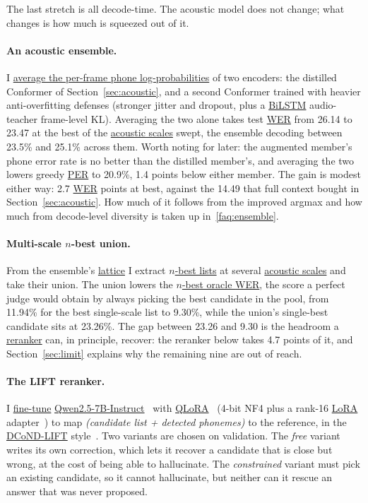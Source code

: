 \documentclass{article}
\DeclareRobustCommand{\glref}[2]{\hyperlink{gl:#1}{\textcolor{glosslink}{#2}}}
\DeclareRobustCommand{\wer}{\glref{wer}{WER}}
\DeclareRobustCommand{\per}{\glref{per}{PER}}
\begin{document}
The last stretch is all decode-time. The acoustic model does not change; what changes is how much is
squeezed out of it.

\paragraph{An acoustic ensemble.}
I \glref{ensemble}{average the per-frame phone log-probabilities} of two encoders: the distilled
Conformer of Section~\ref{sec:acoustic}, and a second Conformer trained with heavier anti-overfitting
defenses (stronger jitter and dropout, plus a \glref{bilstm}{BiLSTM} audio-teacher frame-level KL).
Averaging the two alone takes test \wer{} from 26.14 to 23.47 at the best of the
\glref{scale}{acoustic scales} swept, the ensemble decoding between 23.5\% and 25.1\% across them.
Worth noting for later: the augmented member's phone error rate is no better than the distilled
member's, and averaging the two lowers greedy \per{} to 20.9\%, 1.4 points below either member. The
gain is modest either way: 2.7 \wer{} points at best, against the 14.49 that full context bought in
Section~\ref{sec:acoustic}. How much of it follows from the improved argmax and how much from
decode-level diversity is taken up in~\ref{faq:ensemble}.

\paragraph{Multi-scale $n$-best union.}
From the ensemble's \glref{lattice}{lattice} I extract \glref{nbest}{$n$-best lists} at several
\glref{scale}{acoustic scales} and take their union. The union lowers the
\glref{oracle}{$n$-best oracle \wer{}}, the score a perfect judge would obtain by always picking the
best candidate in the pool, from 11.94\% for the best single-scale list to 9.30\%, while the union's
single-best candidate sits at 23.26\%. The gap between 23.26 and 9.30 is the headroom a
\glref{rerank}{reranker} can, in principle, recover: the reranker below takes 4.7 points of it, and
Section~\ref{sec:limit} explains why the remaining nine are out of reach.

\paragraph{The LIFT reranker.}
I \glref{ft}{fine-tune} \glref{qwen}{Qwen2.5-7B-Instruct}~\citep{qwen2025} with
\glref{qlora}{QLoRA}~\citep{dettmers2023qlora} (4-bit NF4 plus a rank-16
\glref{lora}{LoRA} adapter~\citep{hu2022lora}) to map \emph{(candidate list + detected phonemes)} to
the reference, in the \glref{lift}{DCoND-LIFT} style~\citep{li2024dcond,benster2024mona}. Two variants
are chosen on validation. The \emph{free} variant writes its own correction, which lets it recover a
candidate that is close but wrong, at the cost of being able to hallucinate. The \emph{constrained}
variant must pick an existing candidate, so it cannot hallucinate, but neither can it rescue an
answer that was never proposed.
\end{document}
